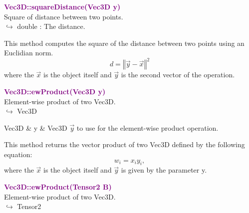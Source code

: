 \textcolor{purple}{\textbf{Vec3D::squareDistance(Vec3D y)}}\label{Vec3D::squareDistance(Vec3D y)}\\
Square of distance between two points.\\ \hspace*{10mm}$\hookrightarrow$ double : The distance.

This method computes the square of the distance between two points using an Euclidian norm.
\begin{equation*}
d = {\left\Vert \overrightarrow{y} - \overrightarrow{x} \right\Vert}^2
\end{equation*}
where the $\overrightarrow{x}$ is the object itself and $\overrightarrow{y}$ is the second vector of the operation.

\textcolor{purple}{\textbf{Vec3D::ewProduct(Vec3D y)}}\label{Vec3D::ewProduct(Vec3D y)}\\
Element-wise product of two Vec3D.\\ \hspace*{10mm}$\hookrightarrow$ Vec3D

\begin{tcolorbox}[width=\textwidth,myArgs,tabularx={ll|R}]
Vec3D & y & Vec3D $\overrightarrow{y}$ to use for the element-wise product operation.
\end{tcolorbox}

This method returns the vector product of two Vec3D defined by the following equation:
\begin{equation*}
w_i = x_i y_i,
\end{equation*}
where the $\overrightarrow{x}$ is the object itself and $\overrightarrow{y}$ is given by the parameter y.

\textcolor{purple}{\textbf{Vec3D::ewProduct(Tensor2 B)}}\label{Vec3D::ewProduct(Tensor2 B)}\\
Element-wise product of two Vec3D.\\ \hspace*{10mm}$\hookrightarrow$ Tensor2


